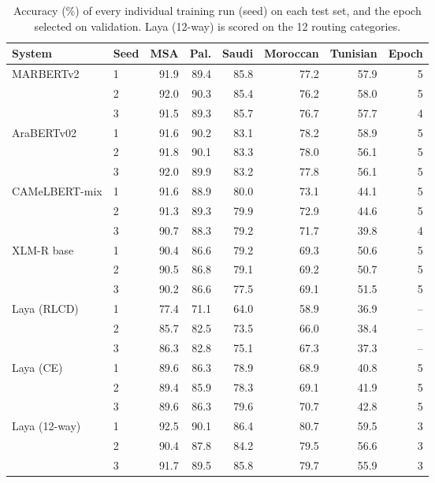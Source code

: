 \begin{table}[t]\centering\small\caption{Accuracy (\%) of every individual training run (seed) on each test set, and the epoch selected on validation. Laya (12-way) is scored on the 12 routing categories.}\label{tab:seeds}
\begin{tabular}{llrrrrrr}\toprule
System & Seed & MSA & Pal. & Saudi & Moroccan & Tunisian & Epoch \\\midrule
MARBERTv2 & 1 & 91.9 & 89.4 & 85.8 & 77.2 & 57.9 & 5 \\
 & 2 & 92.0 & 90.3 & 85.4 & 76.2 & 58.0 & 5 \\
 & 3 & 91.5 & 89.3 & 85.7 & 76.7 & 57.7 & 4 \\
AraBERTv02 & 1 & 91.6 & 90.2 & 83.1 & 78.2 & 58.9 & 5 \\
 & 2 & 91.8 & 90.1 & 83.3 & 78.0 & 56.1 & 5 \\
 & 3 & 92.0 & 89.9 & 83.2 & 77.8 & 56.1 & 5 \\
CAMeLBERT-mix & 1 & 91.6 & 88.9 & 80.0 & 73.1 & 44.1 & 5 \\
 & 2 & 91.3 & 89.3 & 79.9 & 72.9 & 44.6 & 5 \\
 & 3 & 90.7 & 88.3 & 79.2 & 71.7 & 39.8 & 4 \\
XLM-R base & 1 & 90.4 & 86.6 & 79.2 & 69.3 & 50.6 & 5 \\
 & 2 & 90.5 & 86.8 & 79.1 & 69.2 & 50.7 & 5 \\
 & 3 & 90.2 & 86.6 & 77.5 & 69.1 & 51.5 & 5 \\
Laya (RLCD) & 1 & 77.4 & 71.1 & 64.0 & 58.9 & 36.9 & -- \\
 & 2 & 85.7 & 82.5 & 73.5 & 66.0 & 38.4 & -- \\
 & 3 & 86.3 & 82.8 & 75.1 & 67.3 & 37.3 & -- \\
Laya (CE) & 1 & 89.6 & 86.3 & 78.9 & 68.9 & 40.8 & 5 \\
 & 2 & 89.4 & 85.9 & 78.3 & 69.1 & 41.9 & 5 \\
 & 3 & 89.6 & 86.3 & 79.6 & 70.7 & 42.8 & 5 \\
Laya (12-way) & 1 & 92.5 & 90.1 & 86.4 & 80.7 & 59.5 & 3 \\
 & 2 & 90.4 & 87.8 & 84.2 & 79.5 & 56.6 & 3 \\
 & 3 & 91.7 & 89.5 & 85.8 & 79.7 & 55.9 & 3 \\
\bottomrule\end{tabular}\end{table}
